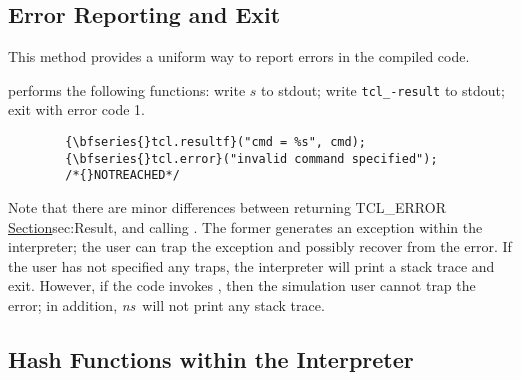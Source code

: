 \subsection{Error Reporting and Exit}
\label{sec:ErrorReporting}

This method provides a uniform way to report errors in the compiled code.
\begin{list}{\textbullet}{}
\item {}
performs the following functions:
write $s$ to stdout; write {\tt tcl\_-\>result} to stdout;
exit with error code 1.
\end{list}
\begin{verbatim}
        {\bfseries{}tcl.resultf}("cmd = %s", cmd);
        {\bfseries{}tcl.error}("invalid command specified");
        /*{}NOTREACHED*/
\end{verbatim}

Note that
there are minor differences between returning TCL\_ERROR
\href{as we did in the previous subsection}{Section}{sec:Result},
and calling .
The former generates an exception within the interpreter;
the user can trap the exception and possibly recover from the error.
If the user has not specified any traps, 
the interpreter will print a stack trace and exit.
However, if the code invokes ,
then the simulation user cannot trap the error;
in addition, \emph{ns}\ will not print any stack trace.

\subsection{Hash Functions within the Interpreter}
\label{sec:HashTables}

